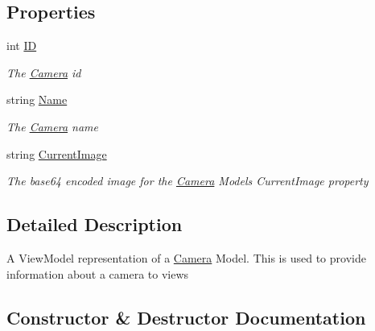 \subsection*{Properties}
\begin{DoxyCompactItemize}
\item 
int \mbox{\hyperlink{class_eagle_eye_1_1_views_1_1_camera_1_1_camera_adde1c217f5dec95f622165afd7f1af16}{ID}}
\begin{DoxyCompactList}\small\item\em The \mbox{\hyperlink{class_eagle_eye_1_1_views_1_1_camera_1_1_camera}{Camera}} id \end{DoxyCompactList}\item 
string \mbox{\hyperlink{class_eagle_eye_1_1_views_1_1_camera_1_1_camera_aac0993dea066c34a044f51f23194551c}{Name}}
\begin{DoxyCompactList}\small\item\em The \mbox{\hyperlink{class_eagle_eye_1_1_views_1_1_camera_1_1_camera}{Camera}} name \end{DoxyCompactList}\item 
string \mbox{\hyperlink{class_eagle_eye_1_1_views_1_1_camera_1_1_camera_aae407995d15f660d45e7ed301146e698}{Current\+Image}}
\begin{DoxyCompactList}\small\item\em The base64 encoded image for the \mbox{\hyperlink{class_eagle_eye_1_1_views_1_1_camera_1_1_camera}{Camera}} Model\textquotesingle{}s Current\+Image property \end{DoxyCompactList}\end{DoxyCompactItemize}


\subsection{Detailed Description}
A View\+Model representation of a \mbox{\hyperlink{class_eagle_eye_1_1_views_1_1_camera_1_1_camera}{Camera}} Model. This is used to provide information about a camera to views 



\subsection{Constructor \& Destructor Documentation}
\mbox{\label{class_eagle_eye_1_1_views_1_1_camera_1_1_camera_ab3ccc315a6ac49b823bcb2985f20ec0b}} 

